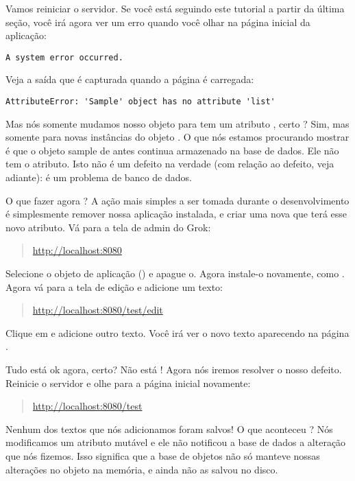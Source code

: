 \documentclass[a4paper,12pt,portuguese]{manual}
\begin{document}
Vamos reiniciar o servidor. Se você está seguindo este tutorial a
partir da última seção, você irá agora ver um erro quando você olhar
na página inicial da aplicação:

\begin{Verbatim}[commandchars=@\[\]]
A system error occurred.
\end{Verbatim}

Veja a saída que é capturada quando a página é carregada:

\begin{Verbatim}[commandchars=@\[\]]
AttributeError: 'Sample' object has no attribute 'list'
\end{Verbatim}

Mas nós somente mudamos nosso objeto para tem um atributo ,
certo ? Sim, mas somente para novas instâncias do objeto . O
que nós estamos procurando mostrar é que o objeto sample de antes
continua armazenado na base de dados. Ele não tem o atributo. Isto não
é um defeito na verdade (com relação ao defeito, veja adiante): é um
problema de banco de dados.

O que fazer agora ? A ação mais simples a ser tomada durante o
desenvolvimento é simplesmente remover nossa aplicação instalada, e
criar uma nova que terá esse novo atributo. Vá para a tela de admin do
Grok:
\begin{quote}

\href{http://localhost:8080}{http://localhost:8080}
\end{quote}

Selecione o objeto de aplicação () e apague o. Agora instale-o
novamente, como . Agora vá para a tela de edição e adicione um
texto:
\begin{quote}

\href{http://localhost:8080/test/edit}{http://localhost:8080/test/edit}
\end{quote}

Clique em  e adicione outro texto. Você irá ver o novo
texto aparecendo na página .

Tudo está ok agora, certo? Não está ! Agora nós iremos resolver o
nosso defeito. Reinicie o servidor e olhe para a página inicial
novamente:
\begin{quote}

\href{http://localhost:8080/test}{http://localhost:8080/test}
\end{quote}

Nenhum dos textos que nós adicionamos foram salvos! O que aconteceu ?
Nós modificamos um atributo mutável e ele não notificou a base de dados
a alteração que nós fizemos. Isso significa que a base de objetos não
só manteve nossas alterações no objeto na memória, e ainda não as
salvou no disco.
\end{document}
